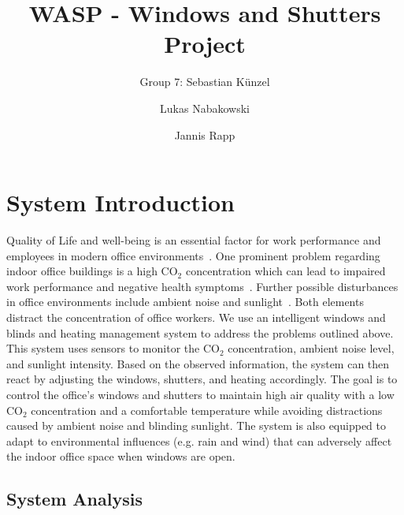 \documentclass[runningheads]{llncs}
\begin{document}
%
\title{WASP - Windows and Shutters Project}

\author{Group 7: Sebastian Künzel \and
Lukas Nabakowski \and
Jannis Rapp}

%
\maketitle              %
%

%
%
%
\section{System Introduction}

Quality of Life and well-being is an essential factor for work performance and employees in modern office environments~\cite{employee_wellbeingimportant}. One prominent problem regarding indoor office buildings is a high CO$_2$ concentration which can lead to impaired work performance and negative health symptoms~\cite{indoor_polutionCO2}. Further possible disturbances in office environments include ambient noise and sunlight~\cite{indoor_noiselight}. Both elements distract the concentration of office workers. 
\newline
We use an intelligent windows and blinds and heating management system to address the problems outlined above.
This system uses sensors to monitor the CO$_2$ concentration, ambient noise level, and sunlight intensity.
Based on the observed information, the system can then react by adjusting the windows, shutters, and heating accordingly.
\newline
The goal is to control the office's windows and shutters to maintain high air quality with a low CO$_2$ concentration and a comfortable temperature while avoiding distractions caused by ambient noise and blinding sunlight. The system is also equipped to adapt to environmental influences (e.g. rain and wind) that can adversely affect the indoor office space when windows are open.   



\subsection{System Analysis}
\end{document}
